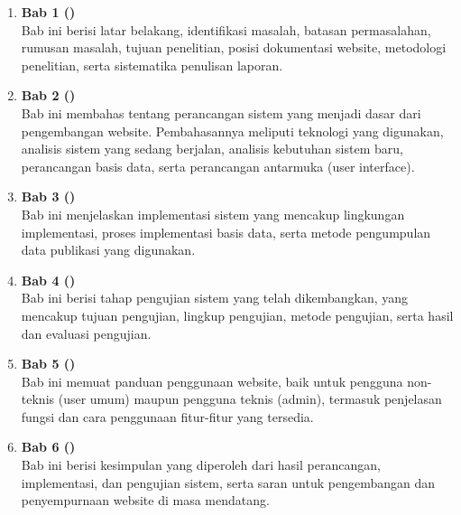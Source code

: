 \begin{enumerate}
    \item \textbf{Bab 1 (\babSatu)}\\
    Bab ini berisi latar belakang, identifikasi masalah, batasan permasalahan, rumusan masalah, tujuan penelitian, posisi dokumentasi website, metodologi penelitian, serta sistematika penulisan laporan.

    \item \textbf{Bab 2 (\babDua)}\\
    Bab ini membahas tentang perancangan sistem yang menjadi dasar dari pengembangan website. Pembahasannya meliputi teknologi yang digunakan, analisis sistem yang sedang berjalan, analisis kebutuhan sistem baru, perancangan basis data, serta perancangan antarmuka (user interface).

    \item \textbf{Bab 3 (\babTiga)}\\
    Bab ini menjelaskan implementasi sistem yang mencakup lingkungan implementasi, proses implementasi basis data, serta metode pengumpulan data publikasi yang digunakan.

    \item \textbf{Bab 4 (\babEmpat)}\\
    Bab ini berisi tahap pengujian sistem yang telah dikembangkan, yang mencakup tujuan pengujian, lingkup pengujian, metode pengujian, serta hasil dan evaluasi pengujian.

    \item \textbf{Bab 5 (\babLima)}\\
    Bab ini memuat panduan penggunaan website, baik untuk pengguna non-teknis (user umum) maupun pengguna teknis (admin), termasuk penjelasan fungsi dan cara penggunaan fitur-fitur yang tersedia.

    \item \textbf{Bab 6 (\babEnam)}\\
    Bab ini berisi kesimpulan yang diperoleh dari hasil perancangan, implementasi, dan pengujian sistem, serta saran untuk pengembangan dan penyempurnaan website di masa mendatang.
\end{enumerate}
